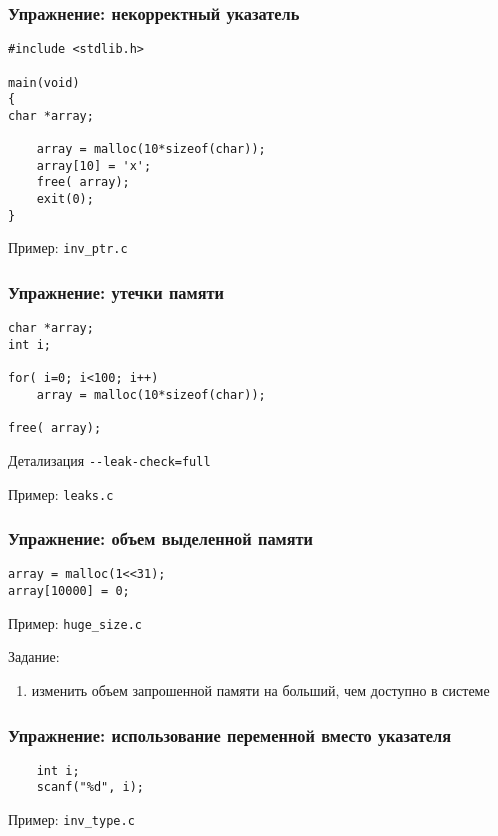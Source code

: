 \begin{frame}[fragile]
	\frametitle{Упражнение: некорректный указатель}

	\begin{lstlisting}
#include <stdlib.h>

main(void)
{
char *array;

    array = malloc(10*sizeof(char));
    array[10] = 'x';
    free( array);
    exit(0);
}
	\end{lstlisting}

	Пример: {\tt inv\_ptr.c}

\end{frame}

\begin{frame}[fragile]
	\frametitle{Упражнение: утечки памяти}

	\begin{lstlisting}
char *array;
int i;

for( i=0; i<100; i++)
    array = malloc(10*sizeof(char));

free( array);
	\end{lstlisting}

	\begin{block}{Детализация}
		{\tt -{}-leak-check=full}
	\end{block}

	Пример: {\tt leaks.c}

\end{frame}

\begin{frame}[fragile]
	\frametitle{Упражнение: объем выделенной памяти}

	\begin{lstlisting}
array = malloc(1<<31);
array[10000] = 0;
	\end{lstlisting}

	Пример: {\tt huge\_size.c}
	
	\bigskip
	\pause

	Задание:
	\begin{enumerate}
		\item изменить объем запрошенной памяти на больший, чем доступно в системе
	\end{enumerate}

\end{frame}

\begin{frame}[fragile]
	\frametitle{Упражнение: использование переменной вместо указателя}

	\begin{lstlisting}
    int i;
    scanf("%d", i);
	\end{lstlisting}

	Пример: {\tt inv\_type.c}
\end{frame}

